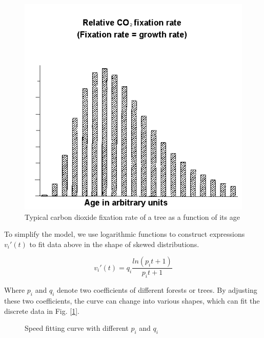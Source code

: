\begin{figure}[h]
    \centering
    \includegraphics[scale = 0.35]{mcmthesis-demo/4/image.png}
    \caption{Typical carbon dioxide fixation rate of a tree as a function of its age\cite{2}}
    \label{fig:waixian}
\end{figure}

To simplify the model, we use logarithmic functions to construct expressions $v_{i}'(t)$ to fit data above in the shape of skewed distributions.

\begin{equation}
    v_{i}'(t) = q_i\frac{ln(p_it+1)}{p_it+1}
\end{equation}

Where $p_i$ and $q_i$ denote two coefficients of different forests or trees. 
By adjusting these two coefficients, the curve can change into various shapes, which can fit the discrete data in Fig. [\ref{fig:waixian}].
\begin{figure}
    \centering
        \vspace{-1ex}
    \caption{Speed fitting curve with different $p_i$ and $q_i$}
    \label{fig:my_label}
\end{figure}

